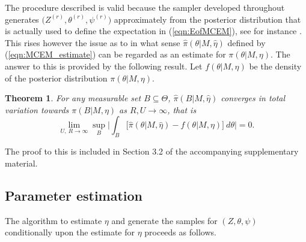 \documentclass{bioinfo}
\newtheorem{thrm}{Theorem}
\begin{document}
The procedure described is valid because the sampler developed
throughout generates $\big(Z^{(r)}, \theta^{(r)}, \psi^{(r)}\big)$
approximately from the posterior distribution that is actually used to
define the expectation in (\ref{eqn:EofMCEM}), see for instance
\cite{FM}. This rises however the issue as to in what sense
$\widehat\pi(\theta|M, \hat\eta)$ defined by (\ref{eqn:MCEM_estimate})
can be regarded as an estimate for $\pi(\theta|M, \eta)$. The answer
to this is provided by the following result. Let $f(\theta|M, \eta)$
be the density of the posterior distribution $\pi(\theta|M, \eta)$.

\begin{thrm} For any measurable set $B\subseteq \Theta$,
 $\widehat\pi(B|M,\hat\eta)$ converges in total variation
towards $\pi(B|M,\eta)$ as $R, U \to \infty$, that is
\[
   \lim_{U,\ R\to\infty}
   \sup_{B}
    \bigg|
     \int_B
     \Big[
       \widehat \pi(\theta|M, \hat\eta) - f(\theta|M,\eta)
     \Big]\ d\theta
    \bigg|
   = 0.
\]
\end{thrm}

The proof to this is included in Section 3.2 of the accompanying 
supplementary material.

\subsection{Parameter estimation}
The algorithm to estimate $\eta$ and generate the samples for $(Z,
\theta, \psi)$ conditionally upon the estimate for $\eta$ proceeds as 
follows. 
\end{document}
